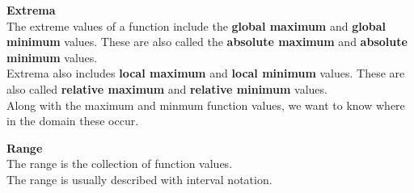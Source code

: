 \documentclass{ximera}
\begin{document}
\begin{explanation}  \textbf{\textcolor{blue!75!black}{Extrema}} \\

The extreme values of a function include the \textbf{\textcolor{purple!85!blue}{global maximum}} and \textbf{\textcolor{purple!85!blue}{global minimum}} values. These are also called the \textbf{\textcolor{purple!85!blue}{absolute maximum}} and \textbf{\textcolor{purple!85!blue}{absolute minimum}} values.  \\

Extrema also includes \textbf{\textcolor{purple!85!blue}{local maximum}} and \textbf{\textcolor{purple!85!blue}{local minimum}} values. These are also called \textbf{\textcolor{purple!85!blue}{relative maximum}} and \textbf{\textcolor{purple!85!blue}{relative minimum}} values.  \\


Along with the maximum and minmum function values, we want to know where in the domain these occur.


\end{explanation}







\begin{explanation}  \textbf{\textcolor{blue!75!black}{Range}} \\

The range is the collection of function values. \\

The range is usually described with interval notation.

\end{explanation}
\end{document}
